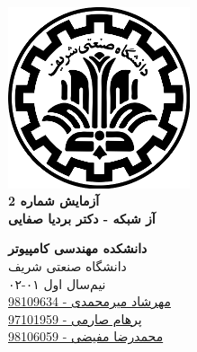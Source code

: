 \documentclass{article}
\begin{document}
\begin{titlepage}
	\begin{center}
		\vspace{0.2cm}
		
		\includegraphics[width=0.4\textwidth]{sharif.png}\\
		\vspace{0.2cm}
		\textbf{ \Huge{آزمایش شماره 2}}\\
		\vspace{0.25cm}
		\textbf{ \Large{آز شبکه - دکتر بردیا صفایی}}
		\vspace{0.2cm}
		
		
		\large \textbf{دانشکده مهندسی کامپیوتر}\\\vspace{0.1cm}
		\large   دانشگاه صنعتی شریف\\\vspace{0.2cm}
		\large   ﻧﯿﻢ‌سال اول ۰۱-۰۲ \\\vspace{0.10cm}
		\large{\href{mailto:mehrshad.mirmohammadi@gmail.com}{مهرشاد میرمحمدی - 98109634}}\\
		\large{\href{mailto:parhaamsaremi@gmail.com}{پرهام صارمی - 97101959}}\\
		\large{\href{mailto:mofayezi.m@gmail.com}{محمدرضا مفیضی - 98106059}}\\
	\end{center}
\end{titlepage}

\newpage

\pagestyle{fancy}
\fancyhf{}
\fancyfoot{}
\setlength{\headheight}{59pt}
\cfoot{\thepage}
\end{document}
